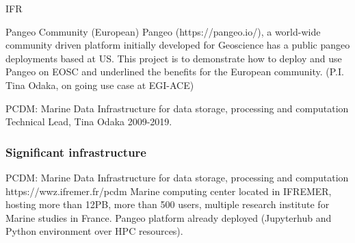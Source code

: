 \begin{sitedescription}{IFR}
\begin{compactenum}
\item Pangeo Community (European)
Pangeo (https://pangeo.io/), a world-wide community driven platform initially
developed for Geoscience  has a public pangeo deployments based at US.
This project  is to demonstrate how to deploy and use Pangeo on EOSC and
underlined the benefits for the European community. (P.I. Tina Odaka, on going use case at EGI-ACE)
\item PCDM: Marine Data Infrastructure for data storage, processing and computation
Technical Lead, Tina Odaka 2009-2019.


\end{compactenum}

\subsubsection*{Significant infrastructure}

\item PCDM: Marine Data Infrastructure for data storage, processing and computation
https://wwz.ifremer.fr/pcdm
Marine computing center located in IFREMER, hosting more than 12PB, more than 500 users,
multiple research institute for Marine studies in France. Pangeo platform already deployed
(Jupyterhub and Python environment over HPC resources).
\item

\end{sitedescription}

